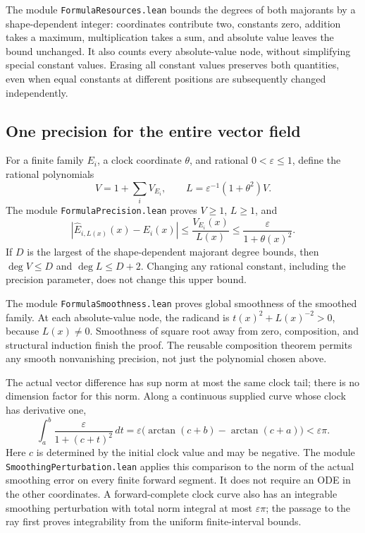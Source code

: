 \documentclass[11pt]{article}
\newcommand{\code}[1]{{\small\nolinkurl{#1}}}
\begin{document}
The module \code{FormulaResources.lean} bounds the degrees of both
majorants by a shape-dependent integer: coordinates contribute two,
constants zero, addition takes a maximum, multiplication takes a sum,
and absolute value leaves the bound unchanged. It also counts every
absolute-value node, without simplifying special constant values. Erasing
all constant values preserves both quantities, even when equal constants
at different positions are subsequently changed independently.

\subsection{One precision for the entire vector field}

For a finite family $E_i$, a clock coordinate $\theta$, and rational
$0<\varepsilon\le1$, define the rational polynomials
\[
 V=1+\sum_i V_{E_i},\qquad
 L=\varepsilon^{-1}(1+\theta^2)V.
\]
The module \code{FormulaPrecision.lean} proves $V\ge1$, $L\ge1$, and
\[
 |\widehat E_{i,L(x)}(x)-E_i(x)|
 \le\frac{V_{E_i}(x)}{L(x)}
 \le\frac{\varepsilon}{1+\theta(x)^2}.
\]
If $D$ is the largest of the shape-dependent majorant degree bounds,
then $\deg V\le D$ and $\deg L\le D+2$. Changing any rational constant,
including the precision parameter, does not change this upper bound.

The module \code{FormulaSmoothness.lean} proves global smoothness of the
smoothed family. At each absolute-value node, the radicand is
$t(x)^2+L(x)^{-2}>0$, because $L(x)\ne0$. Smoothness of square root away
from zero, composition, and structural induction finish the proof. The
reusable composition theorem permits any smooth nonvanishing precision,
not just the polynomial chosen above.

The actual vector difference has sup norm at most the same clock tail;
there is no dimension factor for this norm. Along a continuous supplied
curve whose clock has derivative one,
\[
 \int_a^b\frac{\varepsilon}{1+(c+t)^2}\,dt
 =\varepsilon\bigl(\arctan(c+b)-\arctan(c+a)\bigr)
 <\varepsilon\pi.
\]
Here $c$ is determined by the initial clock value and may be negative.
The module \code{SmoothingPerturbation.lean} applies this comparison to
the norm of the actual smoothing error on every finite forward segment.
It does not require an ODE in the other coordinates. A forward-complete
clock curve also has an integrable smoothing perturbation with total
norm integral at most $\varepsilon\pi$; the passage to the ray first
proves integrability from the uniform finite-interval bounds.
\end{document}
